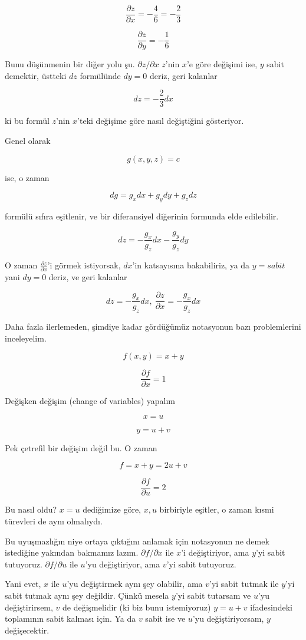 \documentclass[12pt,fleqn]{article}\usepackage{../../common}
\begin{document}
$$ \frac{\partial z}{\partial x} = -\frac{4}{6} = -\frac{2}{3} $$

$$ \frac{\partial z}{\partial y} = -\frac{1}{6} $$

Bunu düşünmenin bir diğer yolu şu. $\partial z/\partial x$ $z$'nin $x$'e
göre değişimi ise, $y$ sabit demektir, üstteki $dz$ formülünde $dy=0$
deriz, geri kalanlar

$$ dz = -\frac{2}{3}dx $$

ki bu formül $z$'nin $x$'teki değişime göre nasıl değiştiğini gösteriyor. 

Genel olarak 

$$ g(x,y,z) = c $$

ise, o zaman 

$$ dg = g_x dx + g_y dy + g_z dz $$

formülü sıfıra eşitlenir, ve bir diferansiyel diğerinin formunda elde
edilebilir. 

$$ dz = -\frac{g_x}{g_z}dx -\frac{g_y}{g_z}dy $$

O zaman $\frac{\partial z}{\partial x}$'i görmek istiyorsak, 
$dx$'in katsayısına bakabiliriz, ya da $y=sabit$ yani $dy=0$ deriz, 
ve geri kalanlar

$$ dz =  -\frac{g_x}{g_z}dx, \ 
\frac{\partial z}{\partial x} = -\frac{g_x}{g_z}dx
$$

Daha fazla ilerlemeden, şimdiye kadar gördüğümüz notasyonun bazı
problemlerini inceleyelim. 

$$ f(x,y) = x+y $$

$$ \frac{\partial f}{\partial x} = 1$$

Değişken değişim (change of variables) yapalım

$$ x = u $$

$$ y = u+v $$

Pek çetrefil bir değişim değil bu. O zaman 

$$ f = x + y = 2u + v $$

$$ \frac{\partial f}{\partial u} = 2$$

Bu nasıl oldu? $x=u$ dediğimize göre, $x,u$ birbiriyle eşitler, o zaman
kısmi türevleri de aynı olmalıydı. 

Bu uyuşmazlığın niye ortaya çıktığını anlamak için notasyonun ne demek
istediğine yakından bakmamız lazım. $\partial f/\partial x$ ile $x$'i 
değiştiriyor, 
ama $y$'yi sabit tutuyoruz. $\partial f/\partial u$ ile $u$'yu değiştiriyor, ama 
$v$'yi 
sabit tutuyoruz.

Yani evet, $x$ ile $u$'yu değiştirmek aynı şey olabilir, ama $v$'yi sabit
tutmak ile $y$'yi sabit tutmak aynı şey değildir. Çünkü mesela $y$'yi sabit
tutarsam ve $u$'yu değiştirirsem, $v$ de değişmelidir (ki biz bunu
istemiyoruz) $y = u+v$ ifadesindeki toplamının sabit kalması için. Ya da $v$ 
sabit ise ve $u$'yu değiştiriyorsam, $y$ değişecektir. 
\end{document}
